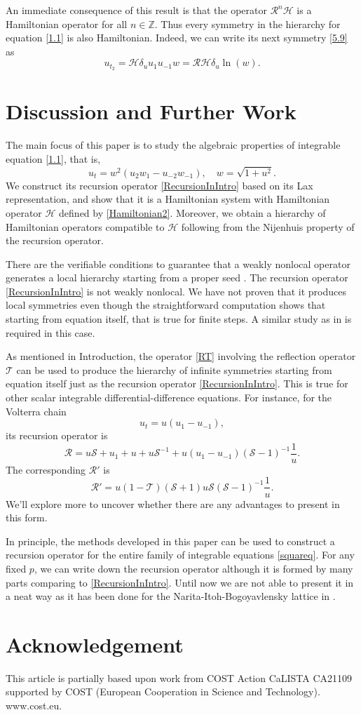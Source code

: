 \documentclass{article}
\numberwithin{equation}{section}
\newcommand\cH{{\mathcal H}}
\newcommand\cS{{\mathcal S}}
\newcommand\cT{{\mathcal T}}
\begin{document}
An immediate consequence of this result is that the operator
$\mathcal{R}^n\mathcal{H}$ is a Hamiltonian operator for all
$n \in \mathbb{Z}$. Thus every symmetry in the hierarchy for equation \eqref{1.1} is also Hamiltonian. Indeed, we can write its next symmetry \eqref{5.9} as
$$u_{t_2}=\mathcal{H} \delta_u u_1 u_{-1} w = \mathcal{R}\mathcal{H} \delta_u \ln(w) .$$

\section{Discussion and Further Work}\label{Sec4}
The main focus of this paper is to study the algebraic properties of integrable equation
\eqref{1.1}, that is,
	\begin{equation*}
		u_t = w^2\left(u_2 w_1 - u_{-2}w_{-1}\right), \quad w = \sqrt{1+u^2} .
		\label{finale}
	\end{equation*}
We construct its recursion operator \eqref{RecursionInIntro} based on its Lax representation, and show that it is a Hamiltonian system with Hamiltonian operator $\cH$ defined by \eqref{Hamiltonian2}. Moreover, we obtain a hierarchy of Hamiltonian operators compatible  to $\cH$ following from the Nijenhuis property of the recursion operator.

There are the verifiable conditions to guarantee that a weakly nonlocal operator generates a local hierarchy starting from a proper seed \cite{82}. The recursion operator \eqref{RecursionInIntro} is not weakly nonlocal. We have not proven that it produces local symmetries even though the straightforward computation shows that starting from equation itself, that is true for finite steps. A similar study as in \cite{4} is required in this case.

As mentioned in Introduction, the operator \eqref{RT} involving the reflection operator $\cT$ can be used to produce the hierarchy of infinite symmetries starting from equation itself just as  the recursion operator \eqref{RecursionInIntro}. This is true for other scalar integrable differential-difference equations. For instance, for the Volterra chain
$$
u_t=u (u_1-u_{-1}),
$$
its recursion operator is
$$
\mathcal{R}= u \cS +u_1 +u +u \cS^{-1} +u (u_1-u_{-1}) (\cS-1)^{-1} \frac{1}{u} .
$$
The corresponding $\mathcal{R}'$ is
$$
\mathcal{R}'= u (1-\cT) (\cS +1) u \cS (\cS-1)^{-1} \frac{1}{u}.
$$
We'll explore more to uncover whether there are any advantages to present in this form.

In principle, the methods developed in this paper can be used to construct a recursion operator for the entire family of integrable equations \eqref{squareq}. For any fixed $p$, we can write down the recursion operator although it is formed by many parts comparing to \eqref{RecursionInIntro}. Until now we are not able to present it in a neat way as it has been done for the Narita-Itoh-Bogoyavlensky
  lattice in \cite{7}.
\section*{Acknowledgement}
This article is partially based upon work from COST Action CaLISTA CA21109 supported by COST (European Cooperation in Science and Technology). www.cost.eu.
	
	
\end{document}
